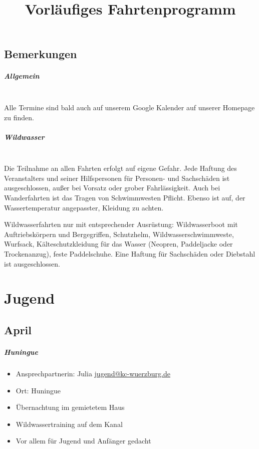 \documentclass[12pt, a4paper]{report}
\title{Vorläufiges Fahrtenprogramm}
\date{}
\begin{document}
\begingroup
    \hypersetup{hidelinks}
    \tableofcontents\thispagestyle{fancy}
\endgroup
\reversemarginpar

\section*{Bemerkungen}\paragraph{Allgemein}\mbox{}\\
Alle Termine sind bald auch auf unserem Google Kalender auf unserer Homepage zu finden.
\paragraph{Wildwasser}\mbox{}\\
Die Teilnahme an allen Fahrten erfolgt auf eigene Gefahr. Jede Haftung des Veranstalters und seiner Hilfspersonen für Personen- und Sachschäden ist ausgeschlossen, außer bei Vorsatz oder grober Fahrlässigkeit. Auch bei Wanderfahrten ist das Tragen von Schwimmwesten Pflicht. Ebenso ist auf, der Wassertemperatur angepasster, Kleidung zu achten.


Wildwasserfahrten nur mit entsprechender Ausrüstung: Wildwasserboot mit Auftriebskörpern und Bergegriffen, Schutzhelm, Wildwasserschwimmweste, Wurfsack, Kälteschutzkleidung für das Wasser (Neopren, Paddeljacke oder Trockenanzug), feste Paddelschuhe. Eine Haftung für Sachschäden oder Diebstahl ist ausgeschlossen.\chapter*{Jugend}
\thispagestyle{Jugend}
\pagestyle{Jugend}
\section*{April}\paragraph{Huningue}
\begin{itemize}
    \item Ansprechpartnerin: Julia \href{mailto:jugend@kc-wuerzburg.de}{jugend@kc-wuerzburg.de}
    \item Ort: Huningue
    \item Übernachtung im gemietetem Haus
    \item Wildwassertraining auf dem Kanal
    \item Vor allem für Jugend und Anfänger gedacht
\end{itemize}
\end{document}
